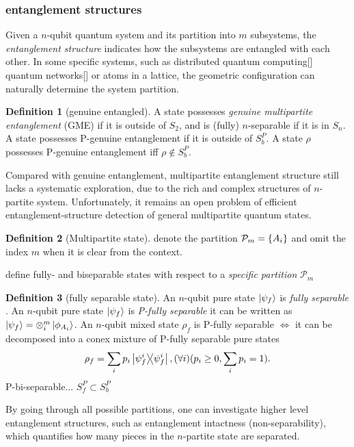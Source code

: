 \documentclass[
10pt,
aps,
pra,
linenumbers,
floatfix,
]{revtex4-2}
\theoremstyle{plain}
\theoremstyle{definition}
\newtheorem{definition}{Definition}
\newtheorem{remark}{Remark}
\newcommand{\ppartition}{\mathcal{P}}
\newcommand{\dm}{\rho}
\begin{document}
\subsubsection{entanglement structures}
Given a $n$-qubit quantum system and its partition into $m$ subsystems, the \emph{entanglement structure} indicates how the subsystems are entangled with each other.
In some specific systems, such as distributed quantum computing[] quantum networks[] or atoms in a lattice, the geometric configuration can naturally determine the system partition.

\begin{definition}[genuine entangled]\label{def:genuinely_entangled}
	A state possesses \emph{genuine multipartite entanglement} (GME) if it is outside of $S_2$, and is (fully) $n$-separable if it is in $S_n$.
	A state possesses P-genuine entanglement if it is outside of $S_b^P$.
	A state $\dm$ possesses P-genuine entanglement iff $\dm\notin S_b^P$.
\end{definition}
	Compared with genuine entanglement, multipartite entanglement structure still lacks a systematic exploration, due to the rich and complex structures of $n$-partite system.
	Unfortunately, it remains an open problem of efficient entanglement-structure detection of general multipartite quantum states.
\begin{definition}[Multipartite state]
	denote the partition $\ppartition_m = \qty{A_i}$
	and omit the index $m$ when it is clear from the context.
\end{definition}
define fully- and biseparable states with respect to a \emph{specific partition} $\ppartition_m$
\begin{definition}[fully separable state]\label{def:fully_separable}
	An $n$-qubit pure state $\ket{\psi_f}$ is \emph{fully separable} \iff .
	An $n$-qubit pure state $\ket{\psi_f}$ is \emph{P-fully separable} \iff it can be written as 
	$\ket{\psi_f}=\otimes_i^m \ket{\phi_{A_i}}$.
	An $n$-qubit mixed state $\dm_f$ is P-fully separable $\iff$ it can be decomposed into a conex mixture of P-fully separable pure states 
	\begin{equation}
		\dm_f = \sum_i p_i \op{\psi_f^i}, (\forall i) ( p_i\ge 0, \sum_i p_i = 1) .
	\end{equation}
	P-bi-separable... $S_f^P \subset S_b^P$
\end{definition}
By going through all possible partitions, one can investigate higher level entanglement structures, such as entanglement intactness (non-separability), which quantifies how many pieces in the $n$-partite state are separated.
\end{document}

